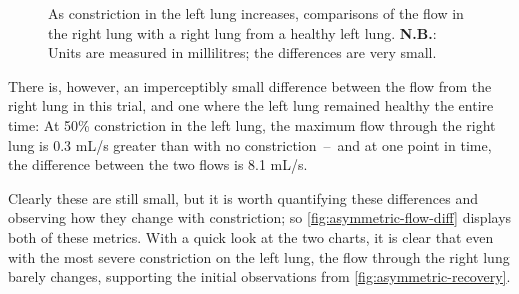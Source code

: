 \begin{figure}[h]
    \centering
    \begin{subfigure}[t]{0.5\textwidth}
        \centering
        \begin{tikzpicture}[scale=.8]
            
        \end{tikzpicture}
    \end{subfigure}%
    \begin{subfigure}[t]{0.5\textwidth}
        \centering
        \begin{tikzpicture}[scale=.8]
            
        \end{tikzpicture}
    \end{subfigure}
    \caption{
        As constriction in the left lung increases, comparisons of the flow in the right lung with a
        right lung from a healthy left lung. \textbf{N.B.}: Units are measured in millilitres; the
        differences are very small.
    }
    \label{fig:asymmetric-flow-diff}
\end{figure}

There is, however, an imperceptibly small difference between the flow from the right lung in this
trial, and one where the left lung remained healthy the entire time: At 50\% constriction in the
left lung, the maximum flow through the right lung is 0.3 mL/s greater than with no
constriction~--~and at one point in time, the difference between the two flows is 8.1 mL/s.

Clearly these are still small, but it is worth quantifying these differences and observing how they
change with constriction; so \autoref{fig:asymmetric-flow-diff} displays both of these metrics. With
a quick look at the two charts, it is clear that even with the most severe constriction on the left
lung, the flow through the right lung barely changes, supporting the initial observations from
\autoref{fig:asymmetric-recovery}.
